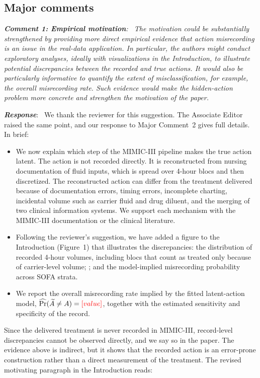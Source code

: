 \documentclass[12pt]{article}
\newcommand{\res}[1]{{\color{red}{#1}}}
\newcommand{\0}{\boldsymbol{0}}
\theoremstyle{definition}
\newcommand{\reviewcomment}[1]{\par\begingroup\itshape\noindent\textbf{#1}:\ }
\newcommand{\reviewresponse}{\par\endgroup\noindent\textbf{\textit{Response}}:\ }
\begin{document}
\subsection*{Major comments}

\reviewcomment{Comment 1: Empirical motivation} The motivation could be substantially strengthened by providing more direct empirical evidence that action misrecording is an issue in the real-data application. In particular, the authors might conduct exploratory analyses, ideally with visualizations in the Introduction, to illustrate potential discrepancies between the recorded and true actions. It would also be particularly informative to quantify the extent of misclassification, for example, the overall misrecording rate. Such evidence would make the hidden-action problem more concrete and strengthen the motivation of the paper.
\reviewresponse
We thank the reviewer for this suggestion. The Associate Editor raised the same point, and our response to Major Comment~2 gives full details. In brief:
\begin{itemize}
    \item We now explain which step of the MIMIC-III pipeline makes the true action latent. The action is not recorded directly. It is reconstructed from nursing documentation of fluid inputs, which is spread over 4-hour blocs and then discretized. The reconstructed action can differ from the treatment delivered because of documentation errors, timing errors, incomplete charting, incidental volume such as carrier fluid and drug diluent, and the merging of two clinical information systems. We support each mechanism with the MIMIC-III documentation or the clinical literature.
    \item Following the reviewer's suggestion, we have added a figure to the Introduction (Figure~1) that illustrates the discrepancies: the distribution of recorded 4-hour volumes, including blocs that count as treated only because of carrier-level volume; \res{indicators of documentation and timing errors in the raw input records}; and the model-implied misrecording probability across SOFA strata.
    \item We report the overall misrecording rate implied by the fitted latent-action model, $\widehat\Pr(\widetilde A\neq A)=\res{[value]}$, together with the estimated sensitivity and specificity of the record.
\end{itemize}
Since the delivered treatment is never recorded in MIMIC-III, record-level discrepancies cannot be observed directly, and we say so in the paper. The evidence above is indirect, but it shows that the recorded action is an error-prone construction rather than a direct measurement of the treatment. The revised motivating paragraph in the Introduction reads:
\end{document}
